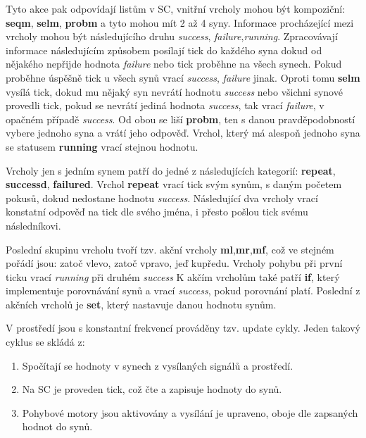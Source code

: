 \par
Tyto akce pak odpovídají listům v SC, vnitřní vrcholy mohou být kompoziční: \textbf{seqm}, \textbf{selm}, \textbf{probm} a tyto mohou mít 2 až 4 syny. Informace procházející mezi vrcholy mohou být následujícího druhu \textit{success}, \textit{failure},\textit{running}. Zpracovávají informace následujícím způsobem posílají tick do každého syna dokud od nějakého nepřijde hodnota \textit{failure} nebo tick proběhne na všech synech. Pokud proběhne úspěšně tick u všech synů vrací \textit{success}, \textit{failure} jinak. Oproti tomu \textbf{selm} vysílá tick, dokud mu nějaký syn nevrátí hodnotu \textit{success} nebo všichni synové provedli tick, pokud se nevrátí jediná hodnota \textit{success}, tak vrací \textit{failure}, v opačném případě \textit{success}. Od obou se liší \textbf{probm}, ten s danou pravděpodobností vybere jednoho syna a vrátí jeho odpověď. Vrchol, který má alespoň jednoho syna se statusem \textbf{running} vrací stejnou hodnotu. \par
Vrcholy jen s jedním synem patří do jedné z následujících kategorií: \textbf{repeat}, \textbf{successd}, \textbf{failured}. Vrchol \textbf{repeat} vrací tick svým synům, s daným početem pokusů, dokud nedostane hodnotu \textit{success}. Následující dva vrcholy vrací konstatní odpověď na tick dle svého jména, i přesto pošlou tick svému následníkovi. \par
Poslední skupinu vrcholu tvoří tzv. akční vrcholy \textbf{ml},\textbf{mr},\textbf{mf}, což ve stejném pořádí jsou: zatoč vlevo, zatoč vpravo, jeď kupředu. Vrcholy pohybu při první ticku vrací \textit{running} při druhém \textit{success} K akčím vrcholům také patří \textbf{if}, který implementuje porovnávání synů a vrací \textit{success}, pokud porovnání platí. Poslední z akčních vrcholů je \textbf{set}, který nastavuje danou hodnotu synům. 
\par
V prostředí jsou s konstantní frekvencí prováděny tzv. update cykly. Jeden takový cyklus se skládá z: 
\par
\begin{enumerate}
    \item Spočítají se hodnoty v synech z vysílaných signálů a prostředí. 
    \item Na SC je proveden tick, což čte a zapisuje hodnoty do synů. 
    \item Pohybové motory jsou aktivovány a vysílání je upraveno, oboje dle zapsaných hodnot do synů.
\end{enumerate}
\par 
